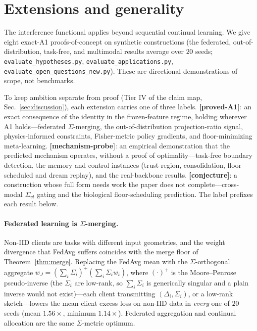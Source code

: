 \documentclass[10pt,a4paper]{article}
\theoremstyle{plain}
\theoremstyle{definition}
\newcommand{\Sig}{\Sigma}
\begin{document}
\section{Extensions and generality}
\label{si:extensions}
The interference functional applies beyond sequential continual learning. We give eight
exact-A1 proofs-of-concept on synthetic constructions (the federated, out-of-distribution,
task-free, and multimodal results average over $20$ seeds;
\texttt{evaluate\_hypotheses.py}, \texttt{evaluate\_applications.py},
\texttt{evaluate\_open\_questions\_new.py}). These are
directional demonstrations of scope, not benchmarks.

To keep ambition separate from proof (Tier IV of the claim map,
Sec.~\ref{sec:discussion}), each extension carries one of three labels.
\textbf{[proved-A1]}: an exact consequence of the identity in the frozen-feature regime,
holding wherever A1 holds---federated $\Sig$-merging, the out-of-distribution
projection-ratio signal, physics-informed constraints, Fisher-metric policy gradients,
and floor-minimizing meta-learning. \textbf{[mechanism-probe]}: an empirical demonstration
that the predicted mechanism operates, without a proof of optimality---task-free boundary
detection, the memory-and-control instances (trust region, consolidation, floor-scheduled
and dream replay), and the real-backbone results. \textbf{[conjecture]}: a construction
whose full form needs work the paper does not complete---cross-modal $\Sig_{vl}$ gating
and the biological floor-scheduling prediction. The label prefixes each result below.

\paragraph{Federated learning is $\Sig$-merging.} Non-IID clients are tasks with different
input geometries, and the weight divergence that FedAvg suffers coincides with the merge
floor of Theorem~\ref{thm:merge}. Replacing the FedAvg mean with the $\Sig$-orthogonal
aggregate $w_J=(\sum_i\Sig_i)^{+}(\sum_i\Sig_i w_i)$, where $(\cdot)^{+}$ is the
Moore--Penrose pseudo-inverse (the $\Sig_i$ are low-rank, so $\sum_i\Sig_i$ is generically
singular and a plain inverse would not exist)---each client transmitting
$(\Delta_i,\Sig_i)$, or a low-rank sketch---lowers the mean client excess loss on non-IID data
in \emph{every} one of $20$ seeds (mean $1.56\times$, minimum $1.14\times$). Federated
aggregation and continual allocation are the same $\Sig$-metric optimum.
\end{document}
